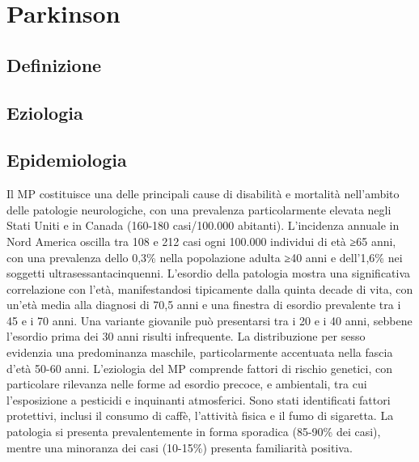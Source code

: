\section{Parkinson}

\subsection{Definizione}

\subsection{Eziologia}

\subsection{Epidemiologia}
Il MP costituisce una delle principali cause di disabilità e mortalità nell'ambito delle patologie neurologiche, con una prevalenza particolarmente elevata negli Stati Uniti e in Canada (160-180 casi/100.000 abitanti). L'incidenza annuale in Nord America oscilla tra 108 e 212 casi ogni 100.000 individui di età ≥65 anni, con una prevalenza dello 0,3\% nella popolazione adulta ≥40 anni e dell'1,6\% nei soggetti ultrasessantacinquenni.
L'esordio della patologia mostra una significativa correlazione con l'età, manifestandosi tipicamente dalla quinta decade di vita, con un'età media alla diagnosi di 70,5 anni e una finestra di esordio prevalente tra i 45 e i 70 anni. Una variante giovanile può presentarsi tra i 20 e i 40 anni, sebbene l'esordio prima dei 30 anni risulti infrequente. La distribuzione per sesso evidenzia una predominanza maschile, particolarmente accentuata nella fascia d'età 50-60 anni.
L'eziologia del MP comprende fattori di rischio genetici, con particolare rilevanza nelle forme ad esordio precoce, e ambientali, tra cui l'esposizione a pesticidi e inquinanti atmosferici. Sono stati identificati fattori protettivi, inclusi il consumo di caffè, l'attività fisica e il fumo di sigaretta. La patologia si presenta prevalentemente in forma sporadica (85-90\% dei casi), mentre una minoranza dei casi (10-15\%) presenta familiarità positiva.

